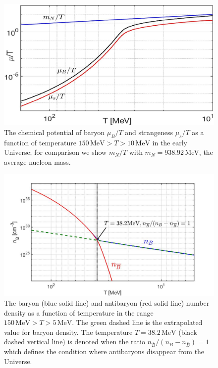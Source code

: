 \begin{figure}[t]
\centering
\includegraphics[width=0.8\linewidth]{./plots/New_Chemical_Potential_C.jpg}
\caption{The chemical potential of baryon $\mu_B/T$ and strangeness $\mu_s/T$ as a function of temperature $150\,\mathrm{MeV}> T>10\,\mathrm{MeV}$ in the early Universe; for comparison we show $m_N/T $ with $m_N=938.92$\,MeV, the average nucleon mass.}
\label{ChemPotFig}
\end{figure}
\begin{figure}[h]
\centering
\includegraphics[width=\textwidth]{./plots/Baryon_Antibaryon_cm.jpg}
\caption{The baryon (blue solid line) and antibaryon (red solid line) number density as a function of temperature in the range $150\,\mathrm{MeV}>T>5\,\mathrm{MeV}$. The green dashed line is the extrapolated value for baryon density. The temperature $T=38.2\,\mathrm{MeV}$ (black dashed vertical line) is denoted when the ratio $n_{\overline B}/(n_B-n_{\overline B})=1$ which defines the condition where antibaryons disappear from the Universe.}
\label{Baryon_fig}
\end{figure}


